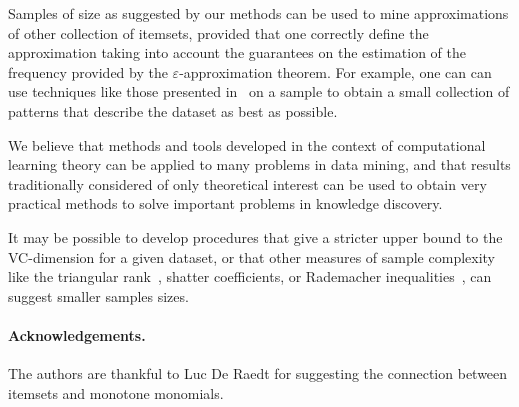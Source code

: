 Samples of size as suggested by our methods can be used to mine approximations
of other collection of itemsets, provided that one correctly define the
approximation taking into account the guarantees on the estimation of the
frequency provided by the $\varepsilon$-approximation theorem. For example, one
can can use techniques like those presented in~\citep{MampaeyTV11} on a sample
to obtain a small collection of patterns that describe the dataset as best as
possible.

We believe that methods and tools developed in the context of computational
learning theory can be applied to many problems in data mining, and that results
traditionally considered of only theoretical interest can be used to obtain very
practical methods to solve important problems in knowledge discovery.

It may be possible to develop procedures that give a stricter upper bound to the
VC-dimension for a given dataset, or that other measures of sample complexity
like the triangular rank~\citep{NewmanR12}, shatter coefficients, or Rademacher
inequalities~\citep{BoucheronBL05}, can suggest smaller samples sizes. 

\paragraph{Acknowledgements.}
The authors are thankful to Luc De Raedt for suggesting the connection between
itemsets and monotone monomials.

%
%

